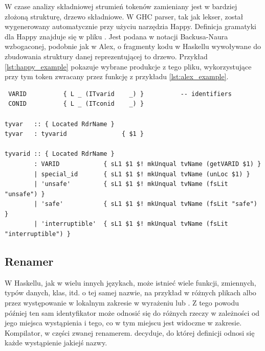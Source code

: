 W czase analizy składniowej strumień tokenów zamieniany jest w bardziej złożoną strukturę, drzewo składniowe. W GHC parser, tak jak lekser, został wygenerowany automatycznie przy użyciu narzędzia Happy. Definicja gramatyki dla Happy znajduje się w pliku . Jest podana w notacji Backusa-Naura wzbogaconej, podobnie jak w Alex, o fragmenty kodu w Haskellu wywoływane do zbudowania struktury danej reprezentującej to drzewo\cite{DocsHappy}. Przykład \ref{lst:happy_example} pokazuje wybrane produkcje z tego pliku, wykorzystujące przy tym token  zwracany przez funkcję  z przykładu \ref{lst:alex_example}.

\begin{lstlisting}[float,label={lst:happy_example},
                   caption={Wycinki z pliku \code{Parser.y} z produkcjami odpowiadającymi za zmienne typów, wykorzystujące tokeny, których dotyczył przykład \ref{lst:alex_example}.}]
%token
 VARID          { L _ (ITvarid    _) }          -- identifiers
 CONID          { L _ (ITconid    _) }

tyvar   :: { Located RdrName }
tyvar   : tyvarid               { $1 }

tyvarid :: { Located RdrName }
        : VARID            { sL1 $1 $! mkUnqual tvName (getVARID $1) }
        | special_id       { sL1 $1 $! mkUnqual tvName (unLoc $1) }
        | 'unsafe'         { sL1 $1 $! mkUnqual tvName (fsLit "unsafe") }
        | 'safe'           { sL1 $1 $! mkUnqual tvName (fsLit "safe") }
        | 'interruptible'  { sL1 $1 $! mkUnqual tvName (fsLit "interruptible") }
\end{lstlisting}

\subsection{Renamer}\label{sec:renamer}

W Haskellu, jak w wielu innych językach, może istnieć wiele funkcji, zmiennych, typów danych, klas, itd. o tej samej nazwie, na przykład w różnych plikach albo przez występowanie w lokalnym zakresie w wyrażeniu  lub . Z tego powodu później ten sam identyfikator może odnosić się do różnych rzeczy w zależności od jego miejsca wystąpienia i tego, co w tym miejscu jest widoczne w zakresie. Kompilator, w części zwanej renamerem. decyduje, do której definicji odnosi się każde wystąpienie jakiejś nazwy.

